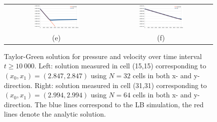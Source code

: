 \begin{figure}[t!]
\begin{tabular}{c c}
\includegraphics[width=0.45\textwidth]{lattice_boltzmann_and_navier_stokes_images/32x32_15x15_taylorgreen_p.png} & \includegraphics[width=0.45\textwidth]{lattice_boltzmann_and_navier_stokes_images/64x64_31x31_taylorgreen_p.png}\\
(e) & (f)
\end{tabular}
\caption{Taylor-Green solution for pressure and velocity over time interval $t\geq 10~000$. Left: solution measured in cell (15,15) corresponding to $(x_0,x_1)=(2.847,2.847)$ using $N=32$ cells in both x- and y-direction. Right: solution measured in cell (31,31) corresponding to $(x_0,x_1)=(2.994,2.994)$ using $N=64$ cells in both x- and y-direction. The blue lines correspond to the LB simulation, the red lines denote the analytic solution.}
\end{figure}



%
%
%
%
%
%
%

